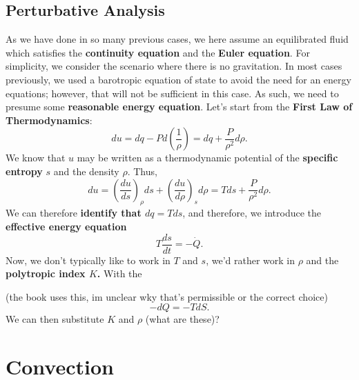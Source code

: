 \subsection*{Perturbative Analysis}
As we have done in so many previous cases, we here assume an equilibrated fluid which satisfies the \textbf{continuity equation} and the \textbf{Euler equation}. For simplicity, we consider the scenario where there is no gravitation. In most cases previously, we used a barotropic equation of state to avoid the need for an energy equations; however, that will not be sufficient in this case. As such, we need to presume some \textbf{reasonable energy equation}. Let's start from the \textbf{First Law of Thermodynamics}:
\[
du = dq - P d \left(\frac{1}{\rho}\right) = dq + \frac{P}{\rho^2} d\rho.
\]
We know that $u$ may be written as a thermodynamic potential of the \textbf{specific entropy} $s$ and the density $\rho$. Thus,
\[
du = \left(\frac{du}{ds}\right)_\rho ds + \left(\frac{du}{d\rho}\right)_s d\rho = Tds + \frac{P}{\rho^2} d\rho.
\]
We can therefore \textbf{identify that $dq = T ds$}, and therefore, we introduce the \textbf{effective energy equation}
\begin{equation}
    \label{eq:therm_instability_energy_eq}
    T \frac{ds}{dt} = - \dot{Q}.
\end{equation}
 Now, we don't typically like to work in $T$ and $s$, we'd rather work in $\rho$ and the \textbf{polytropic index $K$.} With the 


(the book uses this, im unclear wky that's permissible or the correct choice)
\[
- dQ = -T dS.
\]
We can then substitute $K$ and $\rho$ (what are these)?


\section{Convection}



